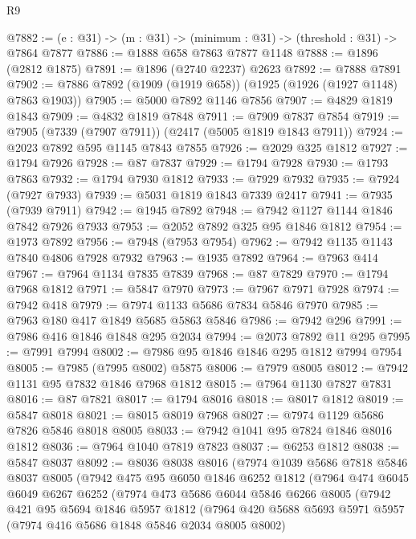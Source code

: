 \begin{lexlean}{R9}
\begin{coremodule}
@7882 := (e : @31) -> (m : @31) -> (minimum : @31) -> (threshold : @31) -> @7864 @7877
@7886 := @1888 @658 @7863 @7877 @1148
@7888 := @1896 (@2812 @1875)
@7891 := @1896 (@2740 @2237) @2623
@7892 := @7888 @7891
@7902 := @7886 @7892 (@1909 (@1919 @658)) (@1925 (@1926 (@1927 @1148) @7863 @1903))
@7905 := @5000 @7892 @1146 @7856
@7907 := @4829 @1819 @1843
@7909 := @4832 @1819 @7848
@7911 := @7909 @7837 @7854
@7919 := @7905 (@7339 (@7907 @7911)) (@2417 (@5005 @1819 @1843 @7911))
@7924 := @2023 @7892 @595 @1145 @7843 @7855
@7926 := @2029 @325 @1812
@7927 := @1794 @7926
@7928 := @87 @7837
@7929 := @1794 @7928
@7930 := @1793 @7863
@7932 := @1794 @7930 @1812
@7933 := @7929 @7932
@7935 := @7924 (@7927 @7933)
@7939 := @5031 @1819 @1843 @7339 @2417
@7941 := @7935 (@7939 @7911)
@7942 := @1945 @7892
@7948 := @7942 @1127 @1144 @1846 @7842 @7926 @7933
@7953 := @2052 @7892 @325 @95 @1846 @1812
@7954 := @1973 @7892
@7956 := @7948 (@7953 @7954)
@7962 := @7942 @1135 @1143 @7840 @4806 @7928 @7932
@7963 := @1935 @7892
@7964 := @7963 @414
@7967 := @7964 @1134 @7835 @7839
@7968 := @87 @7829
@7970 := @1794 @7968 @1812
@7971 := @5847 @7970
@7973 := @7967 @7971 @7928
@7974 := @7942 @418
@7979 := @7974 @1133 @5686 @7834 @5846 @7970
@7985 := @7963 @180 @417 @1849 @5685 @5863 @5846
@7986 := @7942 @296
@7991 := @7986 @416 @1846 @1848 @295 @2034
@7994 := @2073 @7892 @11 @295
@7995 := @7991 @7994
@8002 := @7986 @95 @1846 @1846 @295 @1812 @7994 @7954
@8005 := @7985 (@7995 @8002) @5875
@8006 := @7979 @8005
@8012 := @7942 @1131 @95 @7832 @1846 @7968 @1812
@8015 := @7964 @1130 @7827 @7831
@8016 := @87 @7821
@8017 := @1794 @8016
@8018 := @8017 @1812
@8019 := @5847 @8018
@8021 := @8015 @8019 @7968
@8027 := @7974 @1129 @5686 @7826 @5846 @8018 @8005
@8033 := @7942 @1041 @95 @7824 @1846 @8016 @1812
@8036 := @7964 @1040 @7819 @7823
@8037 := @6253 @1812
@8038 := @5847 @8037
@8092 := @8036
    @8038
    @8016
    (@7974
      @1039
      @5686
      @7818
      @5846
      @8037
      @8005
      (@7942
        @475
        @95
        @6050
        @1846
        @6252
        @1812
        (@7964
          @474
          @6045
          @6049
          @6267
          @6252
          (@7974
            @473
            @5686
            @6044
            @5846
            @6266
            @8005
            (@7942
              @421
              @95
              @5694
              @1846
              @5957
              @1812
              (@7964
                @420
                @5688
                @5693
                @5971
                @5957
                (@7974 @416 @5686 @1848 @5846 @2034 @8005 @8002)

\end{coremodule}
\end{lexlean}
